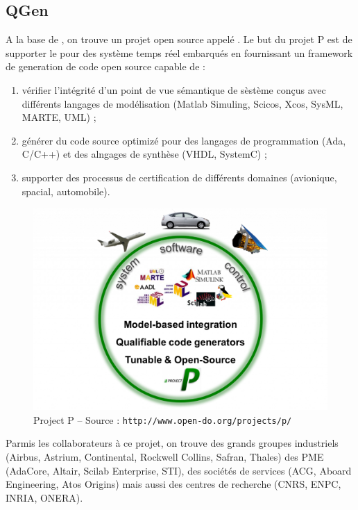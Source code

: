 \subsection{QGen}
A la base de , on trouve un projet open source appelé
. Le but du projet P est de supporter le  pour des
système temps réel embarqués en fournissant un framework de generation de code
open source capable de :
\begin{enumerate}
  \item vérifier l'intégrité d'un point de vue sémantique de sèstème conçus avec
	différents langages de modélisation (Matlab\up{\circledR}
	Simuling\up{\circledR}, Scicos, Xcos, SysML, MARTE, UML) ;
  \item générer du code source optimizé pour des langages de programmation
	(Ada, C/C++) et des alngages de synthèse (VHDL, SystemC) ;
  \item supporter des processus de certification de différents domaines
	(avionique, spacial, automobile).
\end{enumerate}

\begin{figure}[h]
  \centering
  \includegraphics[scale=0.3]{images/projectp}
  \caption{Project P -- Source : {\tt http://www.open-do.org/projects/p/}}
  \label{fig:projectp}
\end{figure}

Parmis les collaborateurs à ce projet, on trouve des grands groupes industriels
(Airbus, Astrium, Continental, Rockwell Collins, Safran, Thales) des PME
(AdaCore, Altair, Scilab Enterprise, STI), des sociétés de services (ACG, Aboard
Engineering, Atos Origins) mais aussi des centres de recherche (CNRS, ENPC,
INRIA, ONERA).\\

